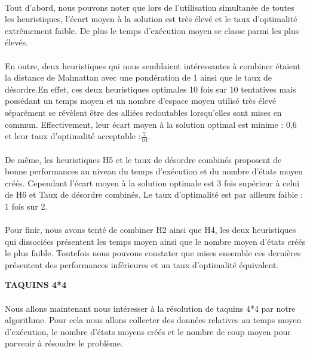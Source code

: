 \documentclass[10pt,a4paper]{report}
\begin{document}
\paragraph{}{Tout d'abord, nous pouvons noter que lors de l'utilisation simultanée de toutes les heuristiques, l'écart moyen à la solution est très élevé et le taux d'optimalité extrêmement faible. De plus le temps d'exécution moyen se classe parmi les plus élevés.}
\paragraph{}{En outre, deux heuristiques qui nous semblaient intéressantes à combiner étaient la distance de Mahnattan avec une pondération de 1 ainsi que le taux de désordre.En effet, ces deux heuristiques optimales 10 fois sur 10 tentatives mais possédant un temps moyen et un nombre d'espace moyen utilisé très élevé séparément  se révèlent être des alliées redoutables lorsqu'elles sont mises en commun. Effectivement, leur écart moyen à la solution optimal est minime : 0,6 et leur taux d'optimalité acceptable :$\frac{7}{10}$. }

\paragraph{}{De même, les heuristiques H5 et le taux de désordre combinés proposent de bonne performances au niveau du temps d'exécution et du nombre d'états moyen créés. Cependant l'écart moyen à la solution optimale est 3 fois supérieur à celui de H6 et Taux de désordre combinés. Le taux d'optimalité est par ailleurs faible : 1 fois sur 2.}

\paragraph{}{Pour finir, nous avons tenté de combiner H2 ainsi que H4, les deux heuristiques qui dissociées présentent les temps moyen ainsi que le nombre moyen d'états créés le plus faible.  Toutefois nous pouvons constater que mises ensemble ces dernières présentent des performances inférieures et un taux d'optimalité équivalent. }
\newline

\textbf{TAQUINS 4*4}

\paragraph{}{Nous allons maintenant nous intéresser à la résolution de taquins 4*4 par notre algorithme. Pour cela nous allons collecter des données relatives au temps moyen d'exécution, le nombre d'états moyens créés et le nombre de coup moyen pour parvenir à résoudre le problème.}
\end{document}

